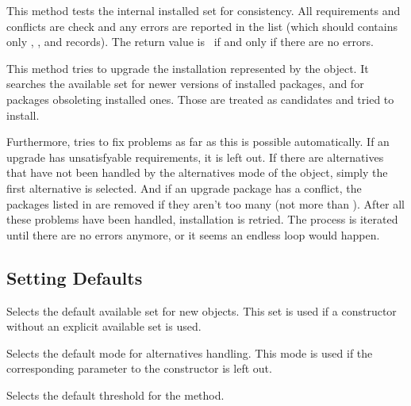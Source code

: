 \documentclass[10pt]{article}
\begin{document}
This method tests the internal installed set for consistency. All
requirements and conflicts are check and any errors are reported in
the  list (which should contains only ,
, and  records). The return
value is \true\ if and only if there are no errors.

This method tries to upgrade the installation represented by the
 object. It searches the available set for newer
versions of installed packages, and for packages obsoleting installed
ones. Those are treated as candidates and tried to install.

Furthermore,  tries to fix problems as far as this is
possible automatically. If an upgrade has unsatisfyable requirements,
it is left out. If there are alternatives that have not been handled
by the alternatives mode of the object, simply the first alternative
is selected. And if an upgrade package has a conflict, the packages
listed in  are removed if they aren't
too many (not more than ). After all these problems
have been handled, installation is retried. The process is iterated
until there are no errors anymore, or it seems an endless loop would
happen.


\subsection{Setting Defaults}

Selects the default available set for new  objects. This
set is used if a constructor without an explicit available set is used.

Selects the default mode for alternatives handling. This mode is used
if the corresponding parameter to the constructor is left out.

Selects the default  threshold for the 
method.


\end{document}

